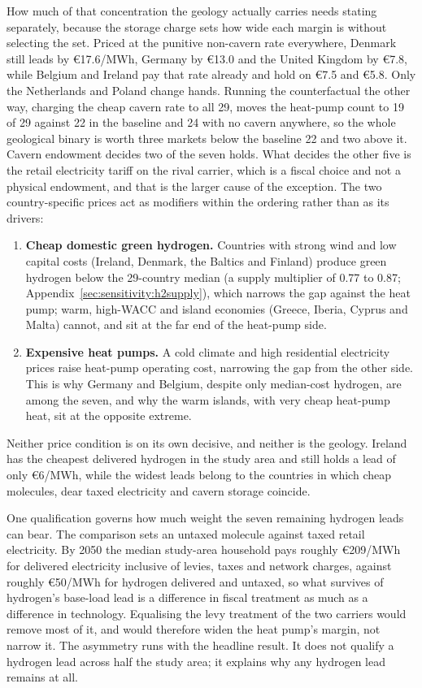 How much of that concentration the geology actually carries needs stating
separately, because the storage charge sets how wide each margin is without selecting
the set. Priced at the punitive non-cavern rate everywhere, Denmark still leads by
\euro{}17.6/MWh, Germany by \euro{}13.0 and the United Kingdom by \euro{}7.8, while
Belgium and Ireland pay that rate already and hold on \euro{}7.5 and \euro{}5.8. Only
the Netherlands and Poland change hands. Running the counterfactual the other way,
charging the cheap cavern rate to all
29, moves the heat-pump count to 19 of 29 against 22 in the baseline and 24 with no
cavern anywhere, so the whole geological binary is worth three markets below the
baseline 22 and two above it. Cavern endowment decides two of the seven holds. What decides the other
five is the retail electricity tariff on the rival carrier, which is a fiscal choice and not a physical endowment, and that is the larger cause of the exception.
The two
country-specific prices act as modifiers within the ordering rather than as its drivers:
\begin{enumerate}
    \item \textbf{Cheap domestic green hydrogen.} Countries with strong wind and
    low capital costs (Ireland, Denmark, the Baltics and Finland) produce green
    hydrogen below the 29-country median (a supply multiplier of 0.77 to 0.87;
    Appendix~\ref{sec:sensitivity:h2supply}), which narrows the gap against the heat
    pump; warm, high-WACC and island economies (Greece, Iberia, Cyprus and Malta)
    cannot, and sit at the far end of the heat-pump side.
    \item \textbf{Expensive heat pumps.} A cold climate and high residential
    electricity prices raise heat-pump operating cost, narrowing the gap from the
    other side. This is why Germany and Belgium, despite only median-cost hydrogen,
    are among the seven, and why the warm islands, with very cheap heat-pump heat,
    sit at the opposite extreme.
\end{enumerate}
Neither price condition is on its own decisive, and neither is the geology. Ireland has the cheapest
delivered hydrogen in the study area and still holds a lead of only
\euro{}6/MWh, while the widest leads belong to the countries in which cheap
molecules, dear taxed electricity and cavern storage coincide.

One qualification governs how much weight the seven remaining hydrogen leads can
bear. The comparison sets an untaxed molecule against taxed retail electricity.
By 2050 the median study-area household pays roughly \euro{}209/MWh for delivered
electricity inclusive of levies, taxes and network charges, against roughly
\euro{}50/MWh for hydrogen delivered and untaxed, so what survives of hydrogen's
base-load lead is a difference in fiscal treatment as much as a difference in
technology. Equalising the levy treatment of the two carriers would remove most of
it, and would therefore widen the heat pump's margin, not narrow it. The asymmetry runs with the headline result. It does not qualify a hydrogen lead across half the study area; it explains why any hydrogen lead remains at all.

